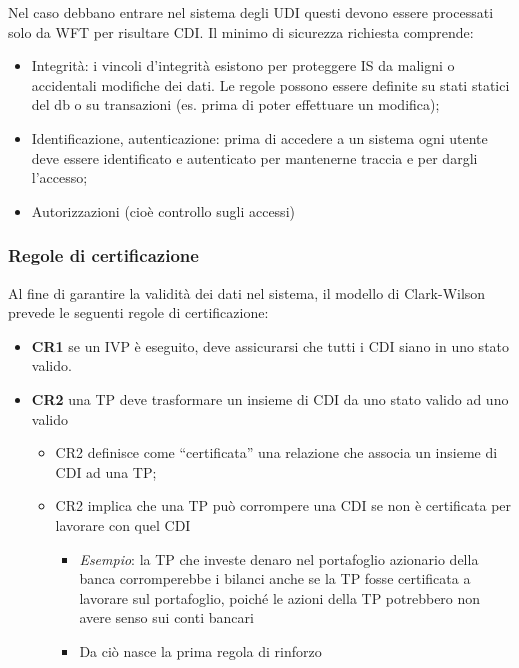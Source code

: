 Nel caso debbano entrare nel sistema degli UDI questi devono essere processati
solo da WFT per
risultare CDI.
Il minimo di sicurezza richiesta comprende:
\begin{itemize}
      \item Integrità: i vincoli d'integrità esistono per proteggere IS da
            maligni o accidentali modifiche
            dei dati. Le regole possono essere definite su stati statici del db
            o su transazioni (es. prima
            di poter effettuare un modifica);
      \item Identificazione, autenticazione: prima di accedere a un sistema ogni
            utente deve essere
            identificato e autenticato per mantenerne traccia e per dargli
            l'accesso;
      \item Autorizzazioni (cioè controllo sugli accessi)
\end{itemize}

\subsubsection{Regole di certificazione}
Al fine di garantire la validità dei dati nel sistema, il modello di
Clark-Wilson prevede le seguenti
regole di certificazione:
\begin{itemize}
      \item \textbf{CR1} se un IVP è eseguito, deve assicurarsi che tutti i CDI
            siano in uno stato valido.
      \item \textbf{CR2} una TP deve trasformare un insieme di CDI da uno stato
            valido ad uno valido
            \begin{itemize}
                  \item CR2 definisce come “certificata” una relazione che
                        associa un insieme di CDI ad
                        una TP;
                  \item CR2 implica che una TP può corrompere una CDI se non è
                        certificata per lavorare
                        con quel CDI
                        \begin{itemize}
                              \item \textit{Esempio}: la TP che investe denaro nel
                                    portafoglio azionario della banca
                                    corromperebbe i bilanci anche se la TP
                                    fosse certificata a lavorare sul
                                    portafoglio, poiché le azioni della TP
                                    potrebbero non avere senso sui conti
                                    bancari
                              \item Da ciò nasce la prima regola di rinforzo
                        \end{itemize}
            \end{itemize}
\end{itemize}

